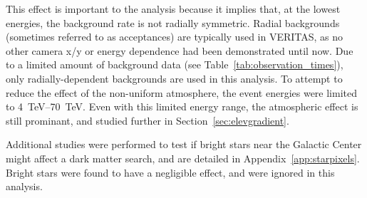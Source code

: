     This effect is important to the analysis because it implies that, at the lowest energies, the background rate is not radially symmetric.
    Radial backgrounds (sometimes referred to as acceptances) are typically used in VERITAS, as no other camera x/y or energy dependence had been demonstrated until now.
    Due to a limited amount of background data (see Table~\ref{tab:observation_times}), only radially-dependent backgrounds are used in this analysis.
    To attempt to reduce the effect of the non-uniform atmosphere, the event energies were limited to \SIrange{4}{70}{TeV}.
    Even with this limited energy range, the atmospheric effect is still prominant, and studied further in Section~\ref{sec:elevgradient}.
    
    Additional studies were performed to test if bright stars near the Galactic Center might affect a dark matter search, and are detailed in Appendix~\ref{app:starpixels}.
    Bright stars were found to have a negligible effect, and were ignored in this analysis.
    
    \FloatBarrier

